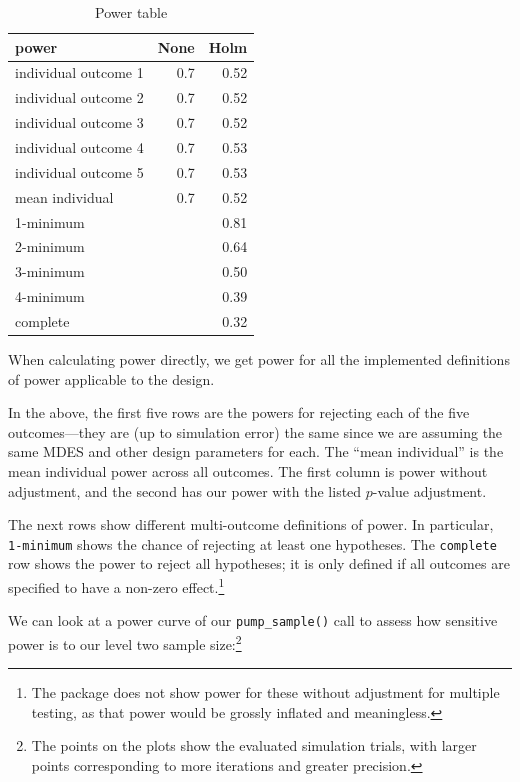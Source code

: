 \documentclass{article}
\begin{document}
\begin{table}[h!]

\caption{\label{tab:unnamed-chunk-7}Power table}
\centering
\begin{tabular}[t]{lrr}
\toprule
power & None & Holm\\
\midrule
individual outcome 1 & 0.7 & 0.52\\
individual outcome 2 & 0.7 & 0.52\\
individual outcome 3 & 0.7 & 0.52\\
individual outcome 4 & 0.7 & 0.53\\
individual outcome 5 & 0.7 & 0.53\\
\addlinespace
mean individual & 0.7 & 0.52\\
1-minimum &  & 0.81\\
2-minimum &  & 0.64\\
3-minimum &  & 0.50\\
4-minimum &  & 0.39\\
\addlinespace
complete &  & 0.32\\
\bottomrule
\end{tabular}
\end{table}

When calculating power directly, we get power for all the implemented
definitions of power applicable to the design.

In the above, the first five rows are the powers for rejecting each of
the five outcomes---they are (up to simulation error) the same since we
are assuming the same MDES and other design parameters for each. The
``mean individual'' is the mean individual power across all outcomes.
The first column is power without adjustment, and the second has our
power with the listed \(p\)-value adjustment.

The next rows show different multi-outcome definitions of power. In
particular, \texttt{1-minimum} shows the chance of rejecting at least
one hypotheses. The \texttt{complete} row shows the power to reject all
hypotheses; it is only defined if all outcomes are specified to have a
non-zero effect.\footnote{The package does not show power for these
  without adjustment for multiple testing, as that power would be
  grossly inflated and meaningless.}

We can look at a power curve of our \texttt{pump\_sample()} call to
assess how sensitive power is to our level two sample size:\footnote{The
  points on the plots show the evaluated simulation trials, with larger
  points corresponding to more iterations and greater precision.}
\end{document}
